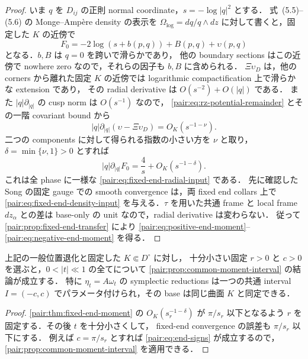 \begin{proof}
いま $q$ を $D_{ij}$ の正則 normal coordinate，$s=-\log|q|^2$ とする．
式~(5.5)--(5.6) の Monge--Amp\`ere density の表示を
$\Omega_{\log}=dq/q\wedge dz$ に対して書くと，固定した $K$ の近傍で
\begin{equation}\label{pair:eq:component-log-density}
 F_0=-2\log(s+b(p,q))+B(p,q)+\upsilon(p,q)
\end{equation}
となる．$b,B$ は $q=0$ を跨いで滑らかであり，
他の boundary sections はこの近傍で nowhere zero なので，それらの因子も $b,B$ に含められる．
$\Xi\upsilon_D$ は，他の corners から離れた固定 $K$ の近傍では
logarithmic compactification 上で滑らかな extension であり，
その radial derivative は $O(s^{-2})+O(|q|)$ である．
また $|q|\partial_{|q|}$ の cusp norm は $O(s^{-1})$ なので，
\eqref{pair:eq:rz-potential-remainder} とその一階 covariant bound から
\[
 |q|\partial_{|q|}(\upsilon-\Xi\upsilon_D)=O_K(s^{-1-\nu}).
\]
二つの components に対して得られる指数の小さい方を $\nu$ と取り，
$\delta=\min\{\nu,1\}>0$ とすれば
\begin{equation}\label{pair:eq:radial-density-derivative}
 |q|\partial_{|q|}F_0
 =\frac4s+O_K(s^{-1-\delta}).
\end{equation}
これは全 phase に一様な \eqref{pair:eq:fixed-end-radial-input} である．
先に確認した Song の固定 gauge での smooth convergence は，両 fixed end collars 上で
\eqref{pair:eq:fixed-end-density-input} を与える．$\tau$ を用いた共通 frame と
local frame $dz_\alpha$ との差は base-only の unit なので，radial derivative は変わらない．
従って \cref{pair:prop:fixed-end-transfer} により
\eqref{pair:eq:positive-end-moment}--\eqref{pair:eq:negative-end-moment} を得る．
\end{proof}

\begin{corollary}
\label{pair:cor:actual-common-moment}
上記の一般位置退化と固定した $K\Subset D^\circ$ に対し，
十分小さい固定 $r>0$ と $c>0$ を選ぶと，$0<|t|\ll1$ の全てについて
\cref{pair:prop:common-moment-interval} の結論が成立する．
特に $\eta_t=A\omega_t$ の symplectic reductions は一つの共通 interval
$I=(-c,c)$ でパラメータ付けられ，その base は同じ曲面 $K$ と同定できる．
\end{corollary}

\begin{proof}
\cref{pair:thm:fixed-end-moment} の $O_K(s_r^{-1-\delta})$ が
$\pi/s_r$ 以下となるよう $r$ を固定する．その後 $t$ を十分小さくして，
fixed-end convergence の誤差も $\pi/s_r$ 以下にする．
例えば $c=\pi/s_r$ とすれば \eqref{pair:eq:end-signs} が成立するので，
\cref{pair:prop:common-moment-interval} を適用できる．
\end{proof}

